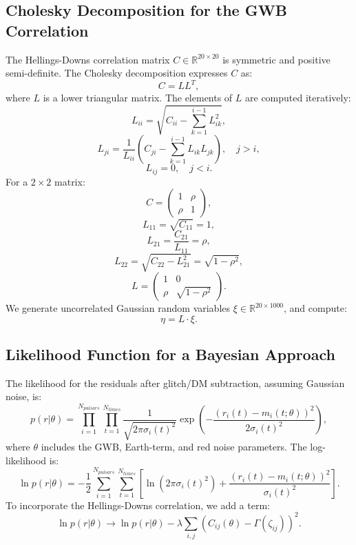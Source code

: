 \documentclass[11pt]{article}
\begin{document}
\subsection{Cholesky Decomposition for the GWB Correlation}
The Hellings-Downs correlation matrix $C \in \mathbb{R}^{20 \times 20}$ is symmetric and positive semi-definite. The Cholesky decomposition expresses $C$ as:
\[
C = L L^T,
\]
where $L$ is a lower triangular matrix. The elements of $L$ are computed iteratively:
\[
L_{ii} = \sqrt{C_{ii} - \sum_{k=1}^{i-1} L_{ik}^2},
\]
\[
L_{ji} = \frac{1}{L_{ii}} \left( C_{ji} - \sum_{k=1}^{i-1} L_{ik} L_{jk} \right), \quad j > i,
\]
\[
L_{ij} = 0, \quad j < i.
\]
For a $2 \times 2$ matrix:
\[
C = \begin{pmatrix} 1 & \rho \\ \rho & 1 \end{pmatrix},
\]
\[
L_{11} = \sqrt{C_{11}} = 1,
\]
\[
L_{21} = \frac{C_{21}}{L_{11}} = \rho,
\]
\[
L_{22} = \sqrt{C_{22} - L_{21}^2} = \sqrt{1 - \rho^2},
\]
\[
L = \begin{pmatrix} 1 & 0 \\ \rho & \sqrt{1 - \rho^2} \end{pmatrix}.
\]
We generate uncorrelated Gaussian random variables $\xi \in \mathbb{R}^{20 \times 1000}$, and compute:
\[
\eta = L \cdot \xi.
\]

\subsection{Likelihood Function for a Bayesian Approach}
The likelihood for the residuals after glitch/DM subtraction, assuming Gaussian noise, is:
\[
p(r | \theta) = \prod_{i=1}^{N_{pulsars}} \prod_{t=1}^{N_{times}} \frac{1}{\sqrt{2\pi \sigma_i(t)^2}} \exp\left( -\frac{(r_i(t) - m_i(t; \theta))^2}{2 \sigma_i(t)^2} \right),
\]
where $\theta$ includes the GWB, Earth-term, and red noise parameters. The log-likelihood is:
\[
\ln p(r | \theta) = -\frac{1}{2} \sum_{i=1}^{N_{pulsars}} \sum_{t=1}^{N_{times}} \left[ \ln(2\pi \sigma_i(t)^2) + \frac{(r_i(t) - m_i(t; \theta))^2}{\sigma_i(t)^2} \right].
\]
To incorporate the Hellings-Downs correlation, we add a term:
\[
\ln p(r | \theta) \rightarrow \ln p(r | \theta) - \lambda \sum_{i,j} \left( C_{ij}(\theta) - \Gamma(\zeta_{ij}) \right)^2.
\]
\end{document}
